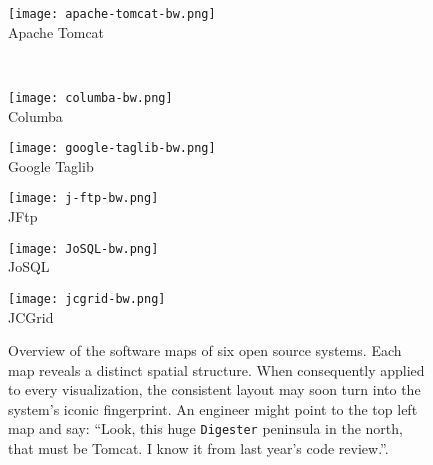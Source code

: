 \newlength{\figwidth}
\setlength{\figwidth}{0.32\textwidth}
\begin{figure*}
\begin{center}
\begin{minipage}{\figwidth}
\begin{center}
  \texttt{[image: apache-tomcat-bw.png]}\\
  Apache Tomcat
\end{center}
\end{minipage}~
\begin{minipage}{\figwidth}
\begin{center}
  \texttt{[image: columba-bw.png]}\\
  Columba
\end{center}
\end{minipage}
\begin{minipage}{\figwidth}
\begin{center}
  \texttt{[image: google-taglib-bw.png]}\\
  Google Taglib
\end{center}
\end{minipage}
\begin{minipage}{\figwidth}
\begin{center}
  \texttt{[image: j-ftp-bw.png]}\\
  JFtp
\end{center}
\end{minipage}
\begin{minipage}{\figwidth}
\begin{center}
  \texttt{[image: JoSQL-bw.png]}\\
  JoSQL
\end{center}
\end{minipage}
\begin{minipage}{\figwidth}
\begin{center}
  \texttt{[image: jcgrid-bw.png]}\\
  JCGrid
\end{center}
\end{minipage}
\end{center}
\vspace{1ex}
    \caption{Overview of the software maps of six open source systems. Each map reveals a distinct spatial structure. When consequently applied to every visualization, the consistent layout may soon turn into the system's iconic fingerprint. An engineer might \eg point to the top left map and say: ``Look, this huge {\tt Digester} peninsula in the north, that must be Tomcat. I know it from last year's code review.''.
    }
    \label{fig:fullpage}
\end{figure*} 

